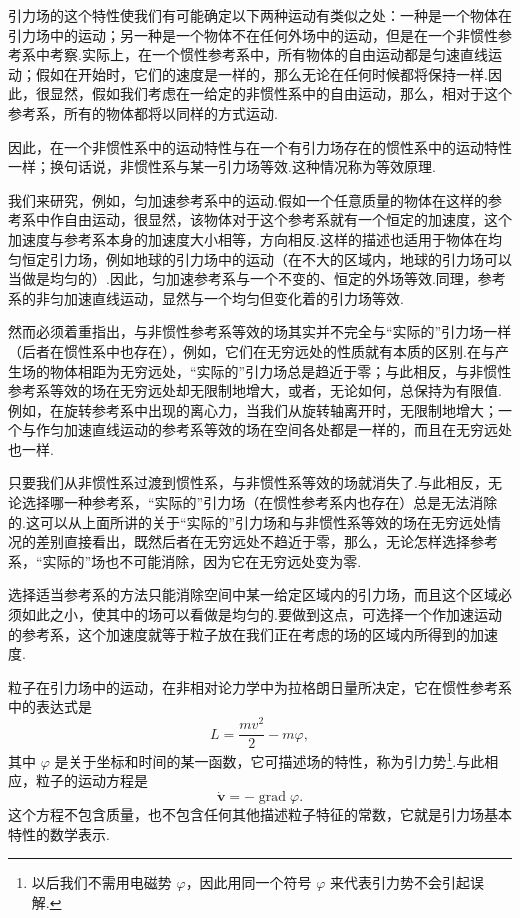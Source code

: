 引力场的这个特性使我们有可能确定以下两种运动有类似之处：一种是一个物体在引力场中的运动；另一种是一个物体不在任何外场中的运动，但是在一个非惯性参考系中考察.实际上，在一个惯性参考系中，所有物体的自由运动都是匀速直线运动；假如在开始时，它们的速度是一样的，那么无论在任何时候都将保持一样.因此，很显然，假如我们考虑在一给定的非惯性系中的自由运动，那么，相对于这个参考系，所有的物体都将以同样的方式运动.

因此，在一个非惯性系中的运动特性与在一个有引力场存在的惯性系中的运动特性一样；换句话说，非惯性系与某一引力场等效.这种情况称为等效原理.

我们来研究，例如，匀加速参考系中的运动.假如一个任意质量的物体在这样的参考系中作自由运动，很显然，该物体对于这个参考系就有一个恒定的加速度，这个加速度与参考系本身的加速度大小相等，方向相反.这样的描述也适用于物体在均匀恒定引力场，例如地球的引力场中的运动（在不大的区域内，地球的引力场可以当做是均匀的）.因此，匀加速参考系与一个不变的、恒定的外场等效.同理，参考系的非匀加速直线运动，显然与一个均匀但变化着的引力场等效.

然而必须着重指出，与非惯性参考系等效的场其实并不完全与“实际的”引力场一样（后者在惯性系中也存在），例如，它们在无穷远处的性质就有本质的区别.在与产生场的物体相距为无穷远处，“实际的”引力场总是趋近于零；与此相反，与非惯性参考系等效的场在无穷远处却无限制地增大，或者，无论如何，总保持为有限值.例如，在旋转参考系中出现的离心力，当我们从旋转轴离开时，无限制地增大；一个与作匀加速直线运动的参考系等效的场在空间各处都是一样的，而且在无穷远处也一样.

只要我们从非惯性系过渡到惯性系，与非惯性系等效的场就消失了.与此相反，无论选择哪一种参考系，“实际的”引力场（在惯性参考系内也存在）总是无法消除的.这可以从上面所讲的关于“实际的”引力场和与非惯性系等效的场在无穷远处情况的差别直接看出，既然后者在无穷远处不趋近于零，那么，无论怎样选择参考系，“实际的”场也不可能消除，因为它在无穷远处变为零.

选择适当参考系的方法只能消除空间中某一给定区域内的引力场，而且这个区域必须如此之小，使其中的场可以看做是均匀的.要做到这点，可选择一个作加速运动的参考系，这个加速度就等于粒子放在我们正在考虑的场的区域内所得到的加速度.

粒子在引力场中的运动，在非相对论力学中为拉格朗日量所决定，它在惯性参考系中的表达式是
\begin{equation}
  L=\frac{mv^2}{2}-m\varphi,
\end{equation}
其中 $\varphi$ 是关于坐标和时间的某一函数，它可描述场的特性，称为引力势\footnote{以后我们不需用电磁势 $\varphi$，因此用同一个符号 $\varphi$ 来代表引力势不会引起误解.}.与此相应，粒子的运动方程是
\begin{equation}
  \dot{\boldsymbol{v}}=-\operatorname{grad}\varphi.
\end{equation}
这个方程不包含质量，也不包含任何其他描述粒子特征的常数，它就是引力场基本特性的数学表示.

